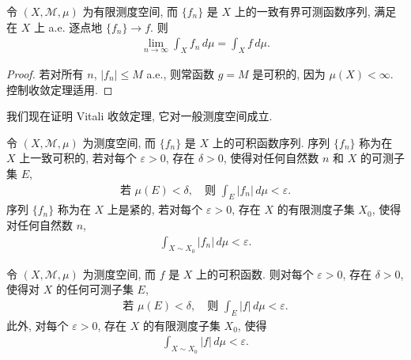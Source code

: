 \documentclass[../../main.tex]{subfiles}
\begin{document}
\begin{corollary}\label{corollary:ch18-dct-bounded}
令 $(X,\mathcal{M},\mu)$ 为有限测度空间, 而 $\{f_{n}\}$ 是 $X$ 上的一致有界可测函数序列, 满足在 $X$ 上 a.e. 逐点地 $\{f_{n}\}\to f$. 则
\begin{align*}
\lim_{n\to\infty}\int_{X}f_{n}\,d\mu=\int_{X}f\,d\mu.
\end{align*}
\end{corollary}

\begin{proof}
若对所有 $n$, $|f_{n}|\leqslant M$ a.e., 则常函数 $g=M$ 是可积的, 因为 $\mu(X)<\infty$. 控制收敛定理适用.
\end{proof}

我们现在证明 Vitali 收敛定理, 它对一般测度空间成立.

\begin{definition}[一致可积与紧性]\label{definition:ch18-uniform-integrability}
令 $(X,\mathcal{M},\mu)$ 为测度空间, 而 $\{f_{n}\}$ 是 $X$ 上的可积函数序列. 序列 $\{f_{n}\}$ 称为在 $X$ 上一致可积的, 若对每个 $\varepsilon>0$, 存在 $\delta>0$, 使得对任何自然数 $n$ 和 $X$ 的可测子集 $E$,
\begin{align*}
\text{若 }\mu(E)<\delta,\quad\text{则 }\int_{E}|f_{n}|\,d\mu<\varepsilon.
\end{align*}
序列 $\{f_{n}\}$ 称为在 $X$ 上是紧的, 若对每个 $\varepsilon>0$, 存在 $X$ 的有限测度子集 $X_{0}$, 使得对任何自然数 $n$,
\begin{align*}
\int_{X\sim X_{0}}|f_{n}|\,d\mu<\varepsilon.
\end{align*}
\end{definition}

\begin{proposition}\label{proposition:ch18-integrability-criterion}
令 $(X,\mathcal{M},\mu)$ 为测度空间, 而 $f$ 是 $X$ 上的可积函数. 则对每个 $\varepsilon>0$, 存在 $\delta>0$, 使得对 $X$ 的任何可测子集 $E$,
\begin{align}
\text{若 }\mu(E)<\delta,\quad\text{则 }\int_{E}|f|\,d\mu<\varepsilon.\label{align:ch18-abs-continuity}
\end{align}
此外, 对每个 $\varepsilon>0$, 存在 $X$ 的有限测度子集 $X_{0}$, 使得
\begin{align}
\int_{X\sim X_{0}}|f|\,d\mu<\varepsilon.\label{align:ch18-tightness}
\end{align}
\end{proposition}
\end{document}
